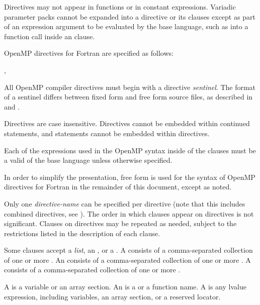 \begin{cppspecific}
Directives may not appear in  functions or in constant expressions.
Variadic parameter packs cannot be expanded into a directive or its clauses
except as part of an expression argument to be evaluated by the base language,
such as into a function call inside an  clause.
\end{cppspecific}

\begin{fortranspecific}
OpenMP directives for Fortran are specified as follows:

\begin{ompfPragma}
\plc{sentinel directive-name [clause[ [},\plc{] clause]...]}
\end{ompfPragma}

All OpenMP compiler directives must begin with a directive \emph{sentinel}. 
The format of a sentinel differs between fixed form and free form source files, 
as described in  and 
.

Directives are case insensitive. Directives cannot be embedded within continued
statements, and statements cannot be embedded within directives.

Each of the expressions used in the OpenMP syntax inside of the clauses must 
be a valid  of the base language unless otherwise specified.

In order to simplify the presentation, free form is used for the syntax of OpenMP
directives for Fortran in the remainder of this document, except as noted.
\end{fortranspecific}

Only one \emph{directive-name} can be specified per directive (note that this 
includes combined directives, see ). The order 
in which clauses appear on directives is not significant. Clauses on directives 
may be repeated as needed, subject to the restrictions listed in the description 
of each clause.

Some clauses accept a \emph{list}, an , or a .  
A  consists of a comma-separated collection of one or more . 
An  consists of a comma-separated collection of one or more
. A  consists of a comma-separated
collection of one or more .

\begin{ccppspecific}
A  is a variable or an array section. An  is
a  or a function name.  A  is any lvalue
expression, including variables, an array section, or a reserved locator.
\end{ccppspecific}

